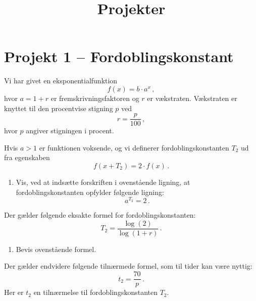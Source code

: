 \documentclass[12pt,oneside,a4paper]{article}
\title{Projekter}
\date{\vspace{-5ex}}
\theoremstyle{plain}
\begin{document}
\maketitle

\section*{Projekt 1 -- Fordoblingskonstant}
Vi har givet en eksponentialfunktion
\[
    f(x) = b\cdot a^x\,,
\]
hvor $a=1+r$ er fremskrivningsfaktoren og $r$ er vækstraten.
Vækstraten er knyttet til den procentvise stigning $p$ ved
\[
    r = \frac{p}{100}\,,
\]
hvor $p$ angiver stigningen i procent.

Hvis $a>1$ er funktionen voksende, og vi definerer fordoblingskonstanten
$T_2$ ud fra egenskaben
\[
    f(x+T_2) = 2\cdot f(x)\,.
\]

\begin{enumerate}[label=(\alph*)]
    \item Vis, ved at indsætte forskriften i ovenstående ligning, at 
fordoblingskonstanten opfylder følgende ligning:
\[
    a^{T_2} = 2\,.
\]
\end{enumerate}

Der gælder følgende eksakte formel for fordoblingskonstanten:
\[
    T_2 = \frac{\log(2)}{\log(1+r)}\,.
\]
\begin{enumerate}[label=(\alph*), resume]
    \item Bevis ovenstående formel.
\end{enumerate}

Der gælder endvidere følgende tilnærmede formel, som til tider kan være nyttig:
\[
    t_2 = \frac{70}{p} \,.
\]
Her er $t_2$ en tilnærmelse til fordoblingskonstanten $T_2$.
\end{document}
